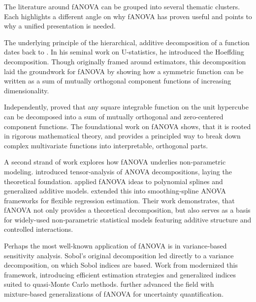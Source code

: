 The literature around fANOVA can be grouped into several thematic clusters. Each highlights a different angle on why fANOVA has proven useful and points to why a unified presentation is needed.\par

The underlying principle of the hierarchical, additive decomposition of a function dates back to \cite{hoeffding1948}. In his seminal work on U-statistics, he introduced the Hoeffding decomposition.
Though originally framed around estimators, this decomposition laid the groundwork for fANOVA by showing how a symmetric function can be written as a sum of mutually orthogonal component functions of increasing dimensionality.\par
Independently, \cite{sobol1993sensitivity} proved that any square integrable function on the unit hypercube can be decomposed into a sum of mutually orthogonal and zero-centered component functions.
The foundational work on fANOVA shows, that it is rooted in rigorous mathematical theory, and provides a principled way to break down complex multivariate functions into interpretable, orthogonal parts.\par

A second strand of work explores how fANOVA underlies non‑parametric modeling.
\citet{takemura1983} introduced tensor‑analysis of ANOVA decompositions, laying the theoretical foundation. \citet{stone1994} applied fANOVA ideas to polynomial splines and generalized additive models. \citet{gu2013} extended this into smoothing‑spline ANOVA frameworks for flexible regression estimation. Their work demonstrates, that fANOVA not only provides a theoretical decomposition, but also serves as a basis for widely-used non‑parametric statistical models featuring additive structure and controlled interactions.\par

Perhaps the most well-known application of fANOVA is in variance‑based sensitivity analysis. Sobol’s original decomposition led directly to a variance decomposition, on which Sobol indices are based.
Work from \cite{owen2013, owen2014} modernized this framework, introducing efficient estimation strategies and generalized indices suited to quasi‑Monte Carlo methods. \citet{borgonovo2022} further advanced the field with mixture‑based generalizations of fANOVA for uncertainty quantification.\par

